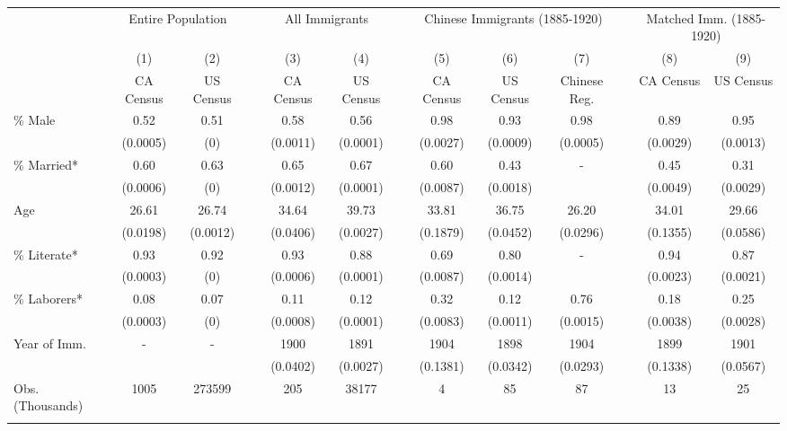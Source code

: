 \begin{tabular}{lcccccccccccc}
\hhline{=============}
& \multicolumn{2}{c}{Entire Population} & & \multicolumn{2}{c}{All Immigrants} & & \multicolumn{3}{c}{Chinese Immigrants (1885-1920)} & & \multicolumn{2}{c}{Matched Imm. (1885-1920)} \\ 
\hhline{~--~--~---~--}
& (1) & (2) & & (3) & (4) & & (5) & (6) & (7) & & (8) & (9) \\ 
& CA Census & US Census & & CA Census & US Census & & CA Census & US Census & Chinese Reg. & & CA Census & US Census \\ 
 \hhline{-------------}
\% Male & 0.52&0.51&&0.58&0.56&&0.98&0.93&0.98&&0.89&0.95 \\ 
& (0.0005)&(0)&&(0.0011)&(0.0001)&&(0.0027)&(0.0009)&(0.0005)&&(0.0029)&(0.0013) \\ 
\% Married* & 0.60&0.63&&0.65&0.67&&0.60&0.43&-&&0.45&0.31 \\ 
& (0.0006)&(0)&&(0.0012)&(0.0001)&&(0.0087)&(0.0018)&&&(0.0049)&(0.0029) \\ 
Age & 26.61&26.74&&34.64&39.73&&33.81&36.75&26.20&&34.01&29.66 \\ 
& (0.0198)&(0.0012)&&(0.0406)&(0.0027)&&(0.1879)&(0.0452)&(0.0296)&&(0.1355)&(0.0586) \\ 
\% Literate* & 0.93&0.92&&0.93&0.88&&0.69&0.80&-&&0.94&0.87 \\ 
& (0.0003)&(0)&&(0.0006)&(0.0001)&&(0.0087)&(0.0014)&&&(0.0023)&(0.0021) \\ 
\% Laborers* & 0.08&0.07&&0.11&0.12&&0.32&0.12&0.76&&0.18&0.25 \\ 
& (0.0003)&(0)&&(0.0008)&(0.0001)&&(0.0083)&(0.0011)&(0.0015)&&(0.0038)&(0.0028) \\ 
Year of Imm. & -&-&&1900&1891&&1904&1898&1904&&1899&1901 \\ 
& &&&(0.0402)&(0.0027)&&(0.1381)&(0.0342)&(0.0293)&&(0.1338)&(0.0567) \\ 
Obs. (Thousands)
&
1005&273599&&205&38177&&4&85&87&&13&25
\\ 
\hhline{-------------}
\end{tabular}
